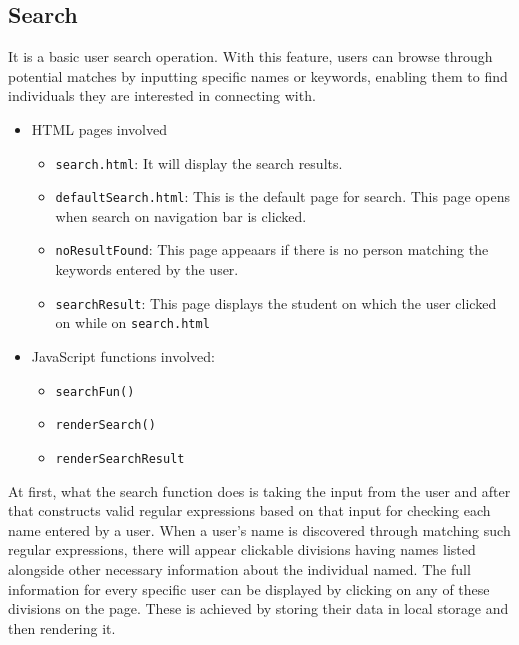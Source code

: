 \documentclass[12pt,a4paper]{article}
\begin{document}
\subsection{Search}
It is a basic user search operation. With this feature, users can browse through potential matches by inputting specific names or keywords, enabling them to find individuals they are interested in connecting with.
\begin{itemize}
    \item HTML pages involved \begin{itemize}
        \item \texttt{search.html}: It will display the search results.
        \item \texttt{defaultSearch.html}: This is the default page for search. This page opens when search on navigation bar is clicked.
        \item \texttt{noResultFound}: This page appeaars if there is no person matching the keywords entered by the user.
        \item \texttt{searchResult}: This page displays the student on which the user clicked on while on \texttt{search.html} 
    \end{itemize}
    \item JavaScript functions involved: \begin{itemize}
        \item \texttt{searchFun()}
        \item \texttt{renderSearch()}
        \item \texttt{renderSearchResult}
    \end{itemize}
\end{itemize}
At first, what the search function does is taking the input from the user and after that constructs valid regular expressions based on that input for checking each name entered by a user. When a user’s name is discovered through matching such regular expressions, there will appear clickable divisions having names listed alongside other necessary information about the individual named. The full information for every specific user can be displayed by clicking on any of these divisions on the page. These is achieved by storing their data in local storage and then rendering it.
\end{document}
